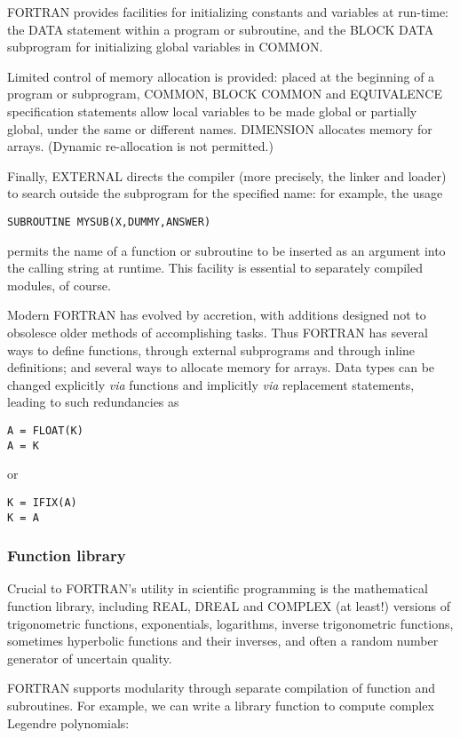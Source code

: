 FORTRAN provides facilities for initializing constants and variables at run-time: the DATA statement within a program or subroutine, and the BLOCK DATA subprogram for initializing global variables in COMMON.

Limited control of memory allocation is provided: placed at the beginning of a program or subprogram, COMMON, BLOCK COMMON and EQUIVALENCE specification statements allow local variables to be made global or partially global, under the same or different names. DIMENSION allocates memory for arrays. (Dynamic re-allocation is not permitted.)

Finally, EXTERNAL directs the compiler (more precisely, the linker and loader) to search outside the subprogram for the specified name: for example, the usage

\begin{verbatim}
SUBROUTINE MYSUB(X,DUMMY,ANSWER)
\end{verbatim}

permits the name of a function or subroutine to be inserted as an argument into the calling string at runtime. This facility is essential to separately compiled modules, of course.

Modern FORTRAN has evolved by accretion, with additions designed not to obsolesce older methods of accomplishing tasks. Thus FORTRAN has several ways to define functions, through external subprograms and through inline definitions; and several ways to allocate memory for arrays. Data types can be changed explicitly \textit{via} functions and implicitly \textit{via} replacement statements, leading to such redundancies as

\begin{verbatim}
A = FLOAT(K) 
A = K
\end{verbatim}
or
\begin{verbatim}
K = IFIX(A)
K = A
\end{verbatim}

\subsubsection{Function library}
Crucial to FORTRAN's utility in scientific programming is the mathematical function library, including REAL, DREAL and COMPLEX (at least!) versions of trigonometric functions, exponentials, logarithms, inverse trigonometric functions, sometimes hyperbolic functions and their inverses, and often a random number generator of uncertain quality. 

FORTRAN supports modularity through separate compilation of function and subroutines. For example, we can write a library function to compute complex Legendre polynomials:

